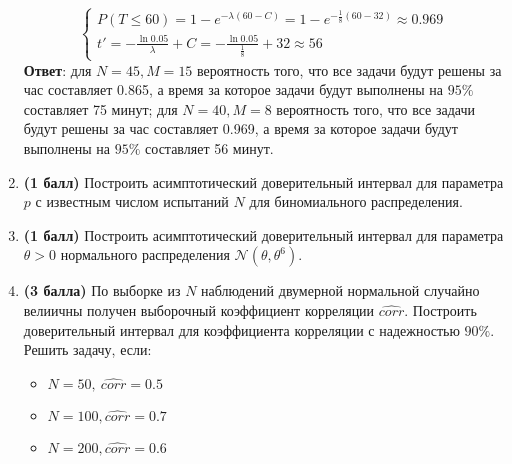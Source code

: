 \documentclass{assignment}
\begin{document}
\begin{enumerate}
\begin{equation}
\begin{cases}
            P(T\leq 60)=1 - e^{-\lambda (60-C)} = 1 - e^{-\frac{1}{8} (60-32)} \approx 0.969 \\
            t' = -\frac{\ln 0.05}{\lambda} + C = -\frac{\ln 0.05}{\frac{1}{8}} + 32 \approx 56
        \end{cases}
    \end{equation}
    \textbf{Ответ}: для $N = 45, M = 15$ вероятность того, что все задачи будут решены за час составляет 0.865, а время за которое задачи будут выполнены на $95\%$ составляет 75 минут; для $N = 40, M = 8$ вероятность того, что все задачи будут решены за час составляет 0.969, а время за которое задачи будут выполнены на $95\%$ составляет 56 минут.
    \finish

    \item \textbf{(1 балл)} Построить асимптотический доверительный интервал для параметра $p$ с известным числом испытаний $N$ для биномиального распределения.

    \item \textbf{(1 балл)} Построить асимптотический доверительный интервал для параметра $\theta > 0$ нормального распределения $\mathcal{N}(\theta, \theta^6)$.


    \item \textbf{(3 балла)} По выборке из $N$ наблюдений двумерной нормальной случайно велиичны получен выборочный коэффициент корреляции $\hat{corr}$. Построить доверительный интервал для коэффициента корреляции с надежностью $90\%$. Решить задачу, если: 

    \begin{itemize}
        \item $N = 50,~ \hat{corr} = 0.5$
        \item $N = 100, \hat{corr} = 0.7$
        \item $N = 200, \hat{corr} = 0.6$


\end{itemize}
\end{enumerate}
\end{document}
